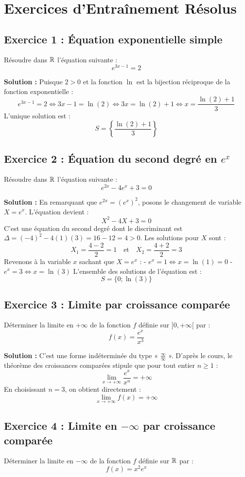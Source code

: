 \section{Exercices d'Entraînement Résolus}

\subsection*{Exercice 1 : Équation exponentielle simple}
Résoudre dans $\mathbb{R}$ l'équation suivante :
\[
e^{3x - 1} = 2
\]

\textbf{Solution :}
Puisque $2 > 0$ et la fonction $\ln$ est la bijection réciproque de la fonction exponentielle :
\[
e^{3x - 1} = 2 \iff 3x - 1 = \ln(2) \iff 3x = \ln(2) + 1 \iff x = \frac{\ln(2) + 1}{3}
\]
L'unique solution est :
\[
S = \left\{ \frac{\ln(2) + 1}{3} \right\}
\]

\subsection*{Exercice 2 : Équation du second degré en $e^x$}
Résoudre dans $\mathbb{R}$ l'équation suivante :
\[
e^{2x} - 4e^x + 3 = 0
\]

\textbf{Solution :}
En remarquant que $e^{2x} = (e^x)^2$, posons le changement de variable $X = e^x$. L'équation devient :
\[
X^2 - 4X + 3 = 0
\]
C'est une équation du second degré dont le discriminant est $\Delta = (-4)^2 - 4(1)(3) = 16 - 12 = 4 > 0$.
Les solutions pour $X$ sont :
\[
X_1 = \frac{4-2}{2} = 1 \quad \text{et} \quad X_2 = \frac{4+2}{2} = 3
\]
Revenons à la variable $x$ sachant que $X = e^x$ :
- $e^x = 1 \iff x = \ln(1) = 0$
- $e^x = 3 \iff x = \ln(3)$
L'ensemble des solutions de l'équation est :
\[
S = \{0; \ln(3)\}
\]

\subsection*{Exercice 3 : Limite par croissance comparée}
Déterminer la limite en $+\infty$ de la fonction $f$ définie sur $]0, +\infty[$ par :
\[
f(x) = \frac{e^x}{x^3}
\]

\textbf{Solution :}
C'est une forme indéterminée du type « $\frac{\infty}{\infty}$ ».
D'après le cours, le théorème des croissances comparées stipule que pour tout entier $n \ge 1$ :
\[
\lim_{x \to +\infty} \frac{e^x}{x^n} = +\infty
\]
En choisissant $n = 3$, on obtient directement :
\[
\lim_{x \to +\infty} f(x) = +\infty
\]

\subsection*{Exercice 4 : Limite en $-\infty$ par croissance comparée}
Déterminer la limite en $-\infty$ de la fonction $f$ définie sur $\mathbb{R}$ par :
\[
f(x) = x^2 e^x
\]

